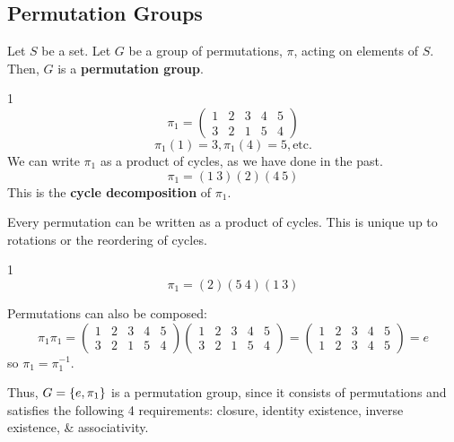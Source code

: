 \subsection{Permutation Groups}
Let $S$ be a set. Let $G$ be a group of permutations, $\pi$,
acting on elements of $S$. Then, $G$ is a \textbf{permutation group}.

\begin{example}1
    \[ \pi_1 = \begin{pmatrix}
        1 & 2 & 3 & 4 & 5 \\ 3 & 2 & 1 & 5 & 4
    \end{pmatrix}
        \]
    \[
        \pi_1(1) = 3, \pi_1(4) = 5, \text{etc.}
    \]
    We can write $\pi_1$ as a product of cycles, as we have 
    done in the past. 
    \[ \pi_1 = (1 \ 3) (2) (4 \ 5)\]
    This is the \textbf{cycle decomposition} of $\pi_1$. 
\end{example}
\begin{theorem}
    Every permutation can be written as a product of cycles. 
    This is unique up to rotations or the reordering of cycles. 
\end{theorem}
\begin{example}1
    \[ \pi_1 = (2) (5 \ 4) (1 \ 3) \]
\end{example}
Permutations can also be composed: 
\[
    \pi_1 \pi_1 = 
    \begin{pmatrix}
        1 & 2 & 3 & 4 & 5 \\ 3 & 2 & 1 & 5 & 4
    \end{pmatrix}
    \begin{pmatrix}
        1 & 2 & 3 & 4 & 5 \\ 3 & 2 & 1 & 5 & 4
    \end{pmatrix}
    = \begin{pmatrix}
        1 & 2 & 3 & 4 & 5 \\ 1 & 2 & 3 & 4 & 5
    \end{pmatrix} = e
\]
so $\pi_1 = \pi_1^{-1}$. 

Thus, $G = \left\{e, \pi_1\right\}$ is a permutation group, since it 
consists of permutations and satisfies the following 4
requirements: closure, identity existence, inverse existence,
\& associativity. 

